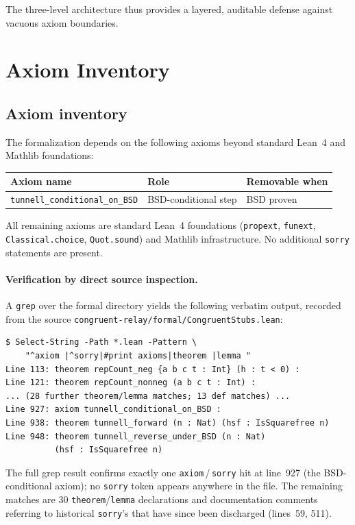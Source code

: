\documentclass[11pt,a4paper]{article}
\theoremstyle{definition}
\begin{document}
The three-level architecture thus provides a layered, auditable
defense against vacuous axiom boundaries.

\section{Axiom Inventory}\label{sec:axiom-inventory}

\subsection*{Axiom inventory}

The formalization depends on the following axioms beyond standard
Lean~4 and Mathlib foundations:

\begin{center}
\begin{tabular}{lll}
\hline
Axiom name & Role & Removable when \\
\hline
\texttt{tunnell\_conditional\_on\_BSD}
  & BSD-conditional step & BSD proven \\
\hline
\end{tabular}
\end{center}

All remaining axioms are standard Lean~4 foundations
(\texttt{propext}, \texttt{funext}, \texttt{Classical.choice},
\texttt{Quot.sound}) and Mathlib infrastructure.  No additional
\texttt{sorry} statements are present.

\paragraph{Verification by direct source inspection.}
A \texttt{grep} over the formal directory yields the following
verbatim output, recorded from the source
\texttt{congruent-relay/formal/CongruentStubs.lean}:
\begin{verbatim}
$ Select-String -Path *.lean -Pattern \
    "^axiom |^sorry|#print axioms|theorem |lemma "
Line 113: theorem repCount_neg {a b c t : Int} (h : t < 0) :
Line 121: theorem repCount_nonneg (a b c t : Int) :
... (28 further theorem/lemma matches; 13 def matches) ...
Line 927: axiom tunnell_conditional_on_BSD :
Line 938: theorem tunnell_forward (n : Nat) (hsf : IsSquarefree n)
Line 948: theorem tunnell_reverse_under_BSD (n : Nat)
          (hsf : IsSquarefree n)
\end{verbatim}
The full grep result confirms exactly one
\texttt{axiom}\,/\,\texttt{sorry} hit at line~927 (the BSD-conditional
axiom); no \texttt{sorry} token appears anywhere in the file.  The
remaining matches are 30 \texttt{theorem}/\texttt{lemma} declarations
and documentation comments referring to historical \texttt{sorry}'s
that have since been discharged (lines~59, 511).
\end{document}
